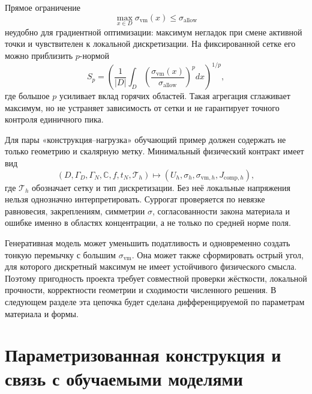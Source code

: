 Прямое ограничение
\begin{equation}
\label{eq:max-von-mises-constraint-v05}
 \max_{x\in D}\sigma_{\mathrm{vm}}(x)
 \le\sigma_{\mathrm{allow}}
\end{equation}
неудобно для градиентной оптимизации: максимум негладок при смене активной точки и чувствителен к локальной дискретизации. На фиксированной сетке его можно приблизить $p$-нормой
\begin{equation}
\label{eq:pnorm-stress-aggregation-v05}
 S_p
 =\left(
 \frac1{|D|}
 \int_D
 \left(
 \frac{\sigma_{\mathrm{vm}}(x)}{\sigma_{\mathrm{allow}}}
 \right)^p dx
 \right)^{1/p},
\end{equation}
где большое $p$ усиливает вклад горячих областей. Такая агрегация сглаживает максимум, но не устраняет зависимость от сетки и не гарантирует точного контроля единичного пика.

\begin{mlconnection}
Для пары «конструкция--нагрузка» обучающий пример должен содержать не только геометрию и скалярную метку. Минимальный физический контракт имеет вид
\begin{equation}
\label{eq:stress-learning-contract-v05}
 (D,\Gamma_D,\Gamma_N,\mathbb C,f,t_N,\mathcal T_h)
 \longmapsto
 (U_h,\sigma_h,\sigma_{\mathrm{vm},h},J_{\mathrm{comp},h}),
\end{equation}
где $\mathcal T_h$ обозначает сетку и тип дискретизации. Без неё локальные напряжения нельзя однозначно интерпретировать. Суррогат проверяется по невязке равновесия, закреплениям, симметрии $\sigma$, согласованности закона материала и ошибке именно в областях концентрации, а не только по средней норме поля.
\end{mlconnection}

Генеративная модель может уменьшить податливость и одновременно создать тонкую перемычку с большим $\sigma_{\mathrm{vm}}$. Она может также сформировать острый угол, для которого дискретный максимум не имеет устойчивого физического смысла. Поэтому пригодность проекта требует совместной проверки жёсткости, локальной прочности, корректности геометрии и сходимости численного решения. В следующем разделе эта цепочка будет сделана дифференцируемой по параметрам материала и формы.

\section{Параметризованная конструкция и связь с обучаемыми моделями}
\label{sec:parametric-elastic-design}
